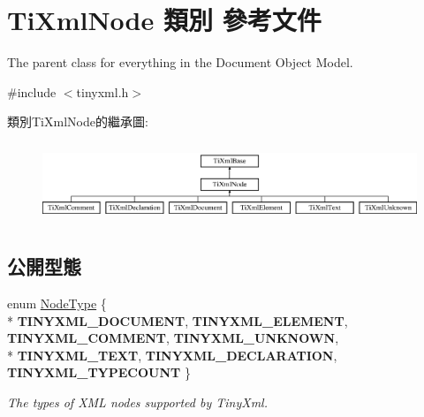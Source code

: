 \hypertarget{class_ti_xml_node}{}\section{Ti\+Xml\+Node 類別 參考文件}
\label{class_ti_xml_node}


The parent class for everything in the Document Object Model.  




{\ttfamily \#include $<$tinyxml.\+h$>$}

類別\+Ti\+Xml\+Node的繼承圖\+:\begin{figure}[H]
\begin{center}
\leavevmode
\includegraphics[height=2.413793cm]{class_ti_xml_node}
\end{center}
\end{figure}
\subsection*{公開型態}
\begin{DoxyCompactItemize}
\item 
enum \hyperlink{class_ti_xml_node_a836eded4920ab9e9ef28496f48cd95a2}{Node\+Type} \{ \\*
{\bfseries T\+I\+N\+Y\+X\+M\+L\+\_\+\+D\+O\+C\+U\+M\+E\+NT}, 
{\bfseries T\+I\+N\+Y\+X\+M\+L\+\_\+\+E\+L\+E\+M\+E\+NT}, 
{\bfseries T\+I\+N\+Y\+X\+M\+L\+\_\+\+C\+O\+M\+M\+E\+NT}, 
{\bfseries T\+I\+N\+Y\+X\+M\+L\+\_\+\+U\+N\+K\+N\+O\+WN}, 
\\*
{\bfseries T\+I\+N\+Y\+X\+M\+L\+\_\+\+T\+E\+XT}, 
{\bfseries T\+I\+N\+Y\+X\+M\+L\+\_\+\+D\+E\+C\+L\+A\+R\+A\+T\+I\+ON}, 
{\bfseries T\+I\+N\+Y\+X\+M\+L\+\_\+\+T\+Y\+P\+E\+C\+O\+U\+NT}
 \}\begin{DoxyCompactList}\small\item\em The types of X\+ML nodes supported by Tiny\+Xml. \end{DoxyCompactList}
\end{DoxyCompactItemize}
